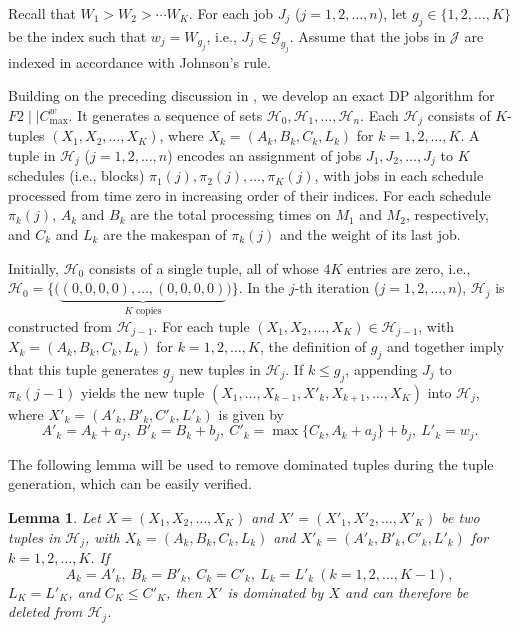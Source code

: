 \documentclass[12pt]{article}
\newtheorem{lemma}{Lemma}[section]
\begin{document}
\begin{sloppypar}
        Recall that $W_1 >W_2 > \cdots W_K$. For each job $J_j$ ($j=1, 2, \ldots, n$), let $g_j \in \{1, 2, \ldots, K\}$ be the index such that $w_j=W_{g_j}$, i.e., $J_j\in\mathcal{G}_{g_j}$. Assume that the jobs in $\mathcal{J}$ are indexed in accordance with Johnson's rule. 
        
        Building on the preceding discussion in , we develop an exact DP algorithm for $F2 \mid \mid C_{\max}^w$. It generates a sequence of sets $\mathcal{H}_0, \mathcal{H}_1, \ldots, \mathcal{H}_n$. Each $\mathcal{H}_j$ consists of $K$-tuples $(X_1, X_2, \ldots, X_K)$, where $X_k=(A_k, B_k, C_k, L_k)$ for $k=1, 2, \ldots, K$. A tuple in $\mathcal{H}_j$ ($j=1, 2, \ldots, n$) encodes an assignment of jobs $J_1, J_2, \ldots, J_j$ to $K$ schedules (i.e., blocks) $\pi_1(j), \pi_2(j), \ldots, \pi_K(j)$, with jobs in each schedule processed from time zero in increasing order of their indices. For each schedule $\pi_k(j)$, $A_k$ and $B_k$ are the total processing times on $M_1$ and $M_2$, respectively, and $C_k$ and $L_k$ are the makespan of $\pi_k(j)$ and the weight of its last job. 
        
        Initially, $\mathcal{H}_0$ consists of a single tuple, all of whose $4K$ entries are zero, i.e., $\mathcal{H}_0=\{\Big (\underbrace{(0,0,0,0),\ldots,(0,0,0,0)}_{K\text{ copies}}\Big)\}$. In the $j$-th iteration ($j=1, 2, \ldots, n$), $\mathcal{H}_j$ is constructed from $\mathcal{H}_{j-1}$. For each tuple $(X_1, X_2, \ldots, X_K) \in \mathcal{H}_{j-1}$, with $X_k=(A_k, B_k, C_k, L_k)$ for $k=1, 2, \ldots, K$, the definition of $g_j$ and  together imply that this tuple generates $g_j$ new tuples in $\mathcal{H}_j$. If $k \leq g_j$, appending $J_j$ to $\pi_k(j-1)$ yields the new tuple $(X_1, \ldots, X_{k-1}, X'_k, X_{k+1}, \ldots, X_K)$ into $\mathcal{H}_j$, where $X'_k=(A'_k, B'_k, C'_k, L'_k)$ is given by         
        \begin{equation} \label{eq-4.2: rec}
            A'_k=A_k+a_j, ~ B'_k=B_k+b_j, ~ C'_k=\max\{C_k, A_k + a_j \}+ b_j, ~ L'_k= w_j.
        \end{equation}
        
        The following lemma will be used to remove dominated tuples during the tuple generation, which can be easily verified.
        
        \begin{lemma}\label{lem:dominance}
            Let $X=(X_1, X_2, \ldots, X_K)$ and $X'=(X'_1, X'_2, \ldots, X'_K)$ be two tuples
            in $\mathcal{H}_j$, with $X_k=(A_k, B_k, C_k, L_k)$ and $X'_k=(A'_k, B'_k, C'_k, L'_k)$ for $k=1, 2, \ldots, K$. If \begin{equation*}
                A_k = A'_k, ~ B_k = B'_k, ~ C_k=C'_k, ~ L_k = L'_k ~ (k=1, 2, \ldots, K-1), 
            \end{equation*}
            $L_K = L'_K$, and $C_K \leq C'_K$, then $X'$ is dominated by $X$ and can therefore be deleted from $\mathcal{H}_j$.
        \end{lemma}
        

\end{sloppypar}
\end{document}
